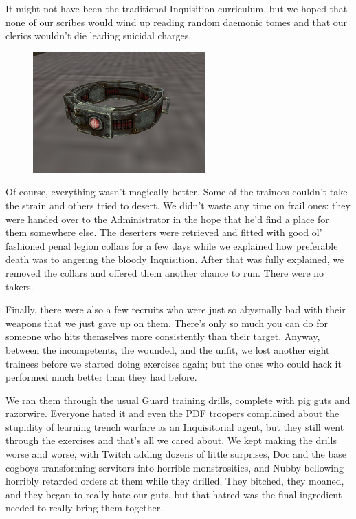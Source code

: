 It might not have been the traditional Inquisition curriculum, but we hoped that none of our scribes would wind up reading random daemonic tomes and that our clerics wouldn’t die leading suicidal charges.

\begin{figure}
	\begin{center}
		\includegraphics[width=\figwidth]{pics/8/25.png}
	\end{center}
\end{figure}
Of course, everything wasn’t magically better. 
Some of the trainees couldn’t take the strain and others tried to desert. 
We didn’t waste any time on frail ones: 
they were handed over to the Administrator in the hope that he’d find a place for them somewhere else. 
The deserters were retrieved and fitted with good ol’ fashioned penal legion collars for a few days while we explained how preferable death was to angering the bloody Inquisition. 
After that was fully explained, we removed the collars and offered them another chance to run. 
There were no takers.

Finally, there were also a few recruits who were just so abysmally bad with their weapons that we just gave up on them. 
There’s only so much you can do for someone who hits themselves more consistently than their target. 
Anyway, between the incompetents, the wounded, and the unfit, we lost another eight trainees before we started doing exercises again; 
but the ones who could hack it performed much better than they had before.

We ran them through the usual Guard training drills, complete with pig guts and razorwire. 
Everyone hated it and even the PDF troopers complained about the stupidity of learning trench warfare as an Inquisitorial agent, but they still went through the exercises and that’s all we cared about. 
We kept making the drills worse and worse, with Twitch adding dozens of little surprises, Doc and the base cogboys transforming servitors into horrible monstrosities, and Nubby bellowing horribly retarded orders at them while they drilled. 
They bitched, they moaned, and they began to really hate our guts, but that hatred was the final ingredient needed to really bring them together.

